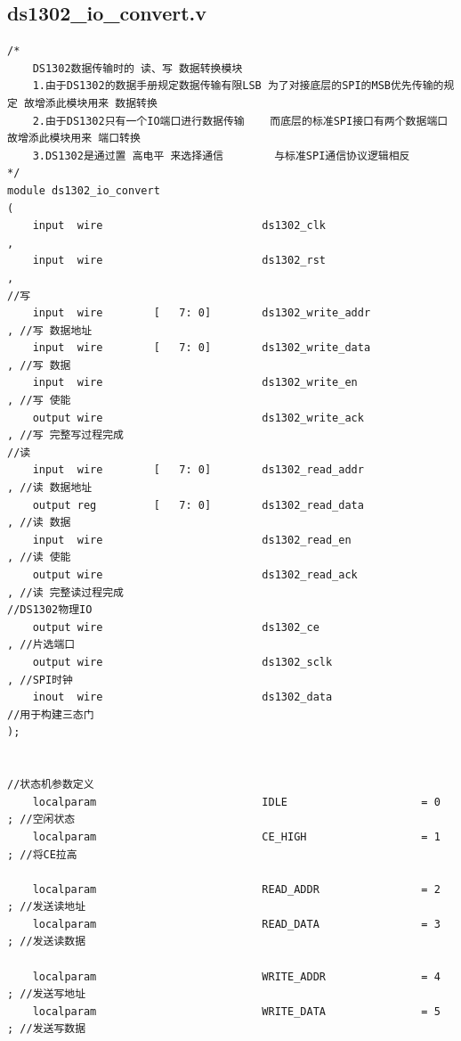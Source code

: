 \documentclass[a4paper,10pt]{article}
\begin{document}
\subsection{ds1302_io_convert.v}
\begin{lstlisting}[caption=ds1302_io_convert.v]
/*
    DS1302数据传输时的 读、写 数据转换模块
    1.由于DS1302的数据手册规定数据传输有限LSB 为了对接底层的SPI的MSB优先传输的规定 故增添此模块用来 数据转换
    2.由于DS1302只有一个IO端口进行数据传输    而底层的标准SPI接口有两个数据端口    故增添此模块用来 端口转换
    3.DS1302是通过置 高电平 来选择通信        与标准SPI通信协议逻辑相反                            
*/
module ds1302_io_convert
(  
    input  wire                         ds1302_clk                            , 
    input  wire                         ds1302_rst                            ,
//写
    input  wire        [   7: 0]        ds1302_write_addr                     , //写 数据地址
    input  wire        [   7: 0]        ds1302_write_data                     , //写 数据
    input  wire                         ds1302_write_en                       , //写 使能 
    output wire                         ds1302_write_ack                      , //写 完整写过程完成
//读
    input  wire        [   7: 0]        ds1302_read_addr                      , //读 数据地址 
    output reg         [   7: 0]        ds1302_read_data                      , //读 数据
    input  wire                         ds1302_read_en                        , //读 使能
    output wire                         ds1302_read_ack                       , //读 完整读过程完成
//DS1302物理IO
    output wire                         ds1302_ce                             , //片选端口
    output wire                         ds1302_sclk                           , //SPI时钟
    inout  wire                         ds1302_data                             //用于构建三态门
);


//状态机参数定义
    localparam                          IDLE                     = 0         ; //空闲状态 
    localparam                          CE_HIGH                  = 1         ; //将CE拉高

    localparam                          READ_ADDR                = 2         ; //发送读地址
    localparam                          READ_DATA                = 3         ; //发送读数据

    localparam                          WRITE_ADDR               = 4         ; //发送写地址
    localparam                          WRITE_DATA               = 5         ; //发送写数据


\end{lstlisting}
\end{document}

